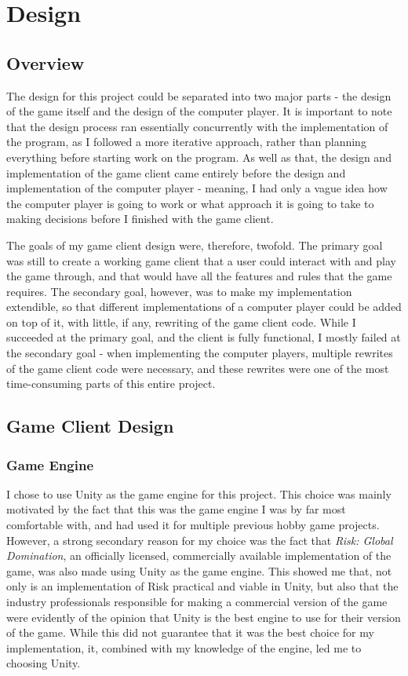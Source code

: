\graphicspath{ {./Images/} }
\chapter{Design}
\section{Overview}
\label{overview}
The design for this project could be separated into two major parts - the design of the game itself and the design of the computer player. It is important to note that the design process ran essentially concurrently with the implementation of the program, as I followed a more iterative approach, rather than planning everything before starting work on the program. As well as that, the design and implementation of the game client came entirely before the design and implementation of the computer player - meaning, I had only a vague idea how the computer player is going to work or what approach it is going to take to making decisions before I finished with the game client.

The goals of my game client design were, therefore, twofold. The primary goal was still to create a working game client that a user could interact with and play the game through, and that would have all the features and rules that the game requires. The secondary goal, however, was to make my implementation extendible, so that different implementations of a computer player could be added on top of it, with little, if any, rewriting of the game client code. While I succeeded at the primary goal, and the client is fully functional, I mostly failed at the secondary goal - when implementing the computer players, multiple rewrites of the game client code were necessary, and these rewrites were one of the most time-consuming parts of this entire project.

\section{Game Client Design}
\label{gameClientDesign}
\subsection{Game Engine}
\label{gameEngine}
I chose to use Unity as the game engine for this project. This choice was mainly motivated by the fact that this was the game engine I was by far most comfortable with, and had used it for multiple previous hobby game projects. However, a strong secondary reason for my choice was the fact that \textit{Risk: Global Domination}, an officially licensed, commercially available implementation of the game, was also made using Unity as the game engine. This showed me that, not only is an implementation of Risk practical and viable in Unity, but also that the industry professionals responsible for making a commercial version of the game were evidently of the opinion that Unity is the best engine to use for their version of the game. While this did not guarantee that it was the best choice for my implementation, it, combined with my knowledge of the engine, led me to choosing Unity.

